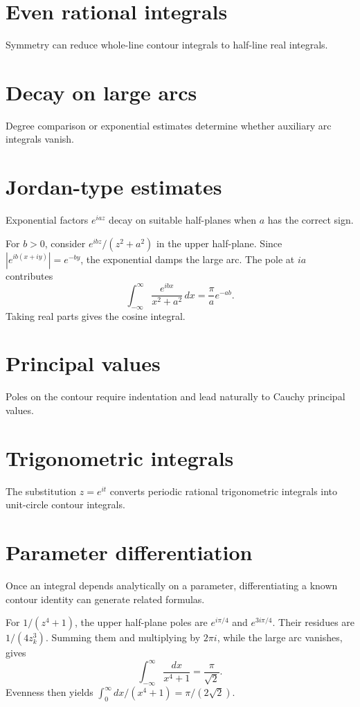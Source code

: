 \section{Even rational integrals}
Symmetry can reduce whole-line contour integrals to half-line real integrals.

\section{Decay on large arcs}
Degree comparison or exponential estimates determine whether auxiliary arc integrals vanish.

\section{Jordan-type estimates}
Exponential factors $e^{iaz}$ decay on suitable half-planes when $a$ has the correct sign.

\begin{example}\label{ex:iv11-expand-02}
For \(b>0\), consider \(e^{ibz}/(z^2+a^2)\) in the upper half-plane. Since \(|e^{ib(x+iy)}|=e^{-by}\), the exponential damps the large arc. The pole at \(ia\) contributes
\[
\int_{-\infty}^{\infty}\frac{e^{ibx}}{x^2+a^2}\,dx=\frac{\pi}{a}e^{-ab}.
\]
Taking real parts gives the cosine integral.
\end{example}
\section{Principal values}
Poles on the contour require indentation and lead naturally to Cauchy principal values.

\section{Trigonometric integrals}
The substitution $z=e^{it}$ converts periodic rational trigonometric integrals into unit-circle contour integrals.

\section{Parameter differentiation}
Once an integral depends analytically on a parameter, differentiating a known contour identity can generate related formulas.

\begin{example}\label{ex:iv11-expand-03}
For \(1/(z^4+1)\), the upper half-plane poles are \(e^{i\pi/4}\) and \(e^{3i\pi/4}\). Their residues are \(1/(4z_k^3)\). Summing them and multiplying by \(2\pi i\), while the large arc vanishes, gives
\[
\int_{-\infty}^{\infty}\frac{dx}{x^4+1}=\frac{\pi}{\sqrt2}.
\]
Evenness then yields \(\int_0^\infty dx/(x^4+1)=\pi/(2\sqrt2)\).
\end{example}
